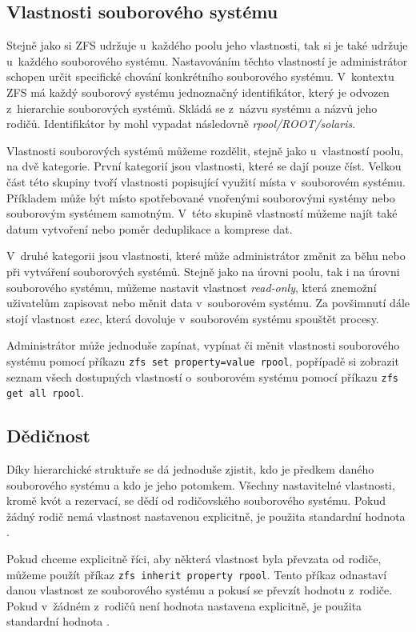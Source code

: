 \subsection{Vlastnosti souborového systému}
Stejně jako si ZFS udržuje u~každého poolu jeho vlastnosti, tak si je také udržuje u~každého souborového systému. Nastavováním těchto vlastností je administrátor schopen určit specifické chování konkrétního souborového systému. V~kontextu ZFS má každý souborový systému jednoznačný identifikátor, který je odvozen z~hierarchie souborových systémů. Skládá se z~názvu systému a názvů jeho rodičů. Identifikátor by mohl vypadat následovně \emph{rpool/ROOT/solaris}.

Vlastnosti souborových systémů můžeme rozdělit, stejně jako u~vlastností poolu, na dvě kategorie. První kategorií jsou vlastnosti, které se dají pouze číst. Velkou část této skupiny tvoří vlastnosti popisující využití místa v~souborovém systému. Příkladem může být místo spotřebované vnořenými souborovými systémy nebo souborovým systémem samotným. V~této skupině vlastností můžeme najít také datum vytvoření nebo poměr deduplikace a komprese dat.

V~druhé kategorii jsou vlastnosti, které může administrátor změnit za běhu nebo při vytváření souborových systémů. Stejně jako na úrovni poolu, tak i na úrovni souborového systému, můžeme nastavit vlastnost \emph{read-only}, která znemožní uživatelům zapisovat nebo měnit data v~souborovém systému. Za povšimnutí dále stojí vlastnost \emph{exec}, která dovoluje v~souborovém systému spouštět procesy.

Administrátor může jednoduše zapínat, vypínat či měnit vlastnosti souborového systému pomocí příkazu \verb|zfs set property=value rpool|, popřípadě si zobrazit seznam všech dostupných vlastností o~souborovém systému pomocí příkazu \verb|zfs get all rpool|.

\subsection{Dědičnost}
Díky hierarchické struktuře se dá jednoduše zjistit, kdo je předkem daného souborového systému a kdo je jeho potomkem. Všechny nastavitelné vlastnosti, kromě kvót a rezervací, se dědí od rodičovského souborového systému. Pokud žádný rodič nemá vlastnost nastavenou explicitně, je použita standardní hodnota \cite{inheriting}.

Pokud chceme explicitně říci, aby některá vlastnost byla převzata od rodiče, můžeme použít příkaz \verb|zfs inherit property rpool|. Tento příkaz odnastaví danou vlastnost ze souborového systému a pokusí se převzít hodnotu z~rodiče. Pokud v~žádném z~rodičů není hodnota nastavena explicitně, je použita standardní hodnota \cite{inheriting}.
